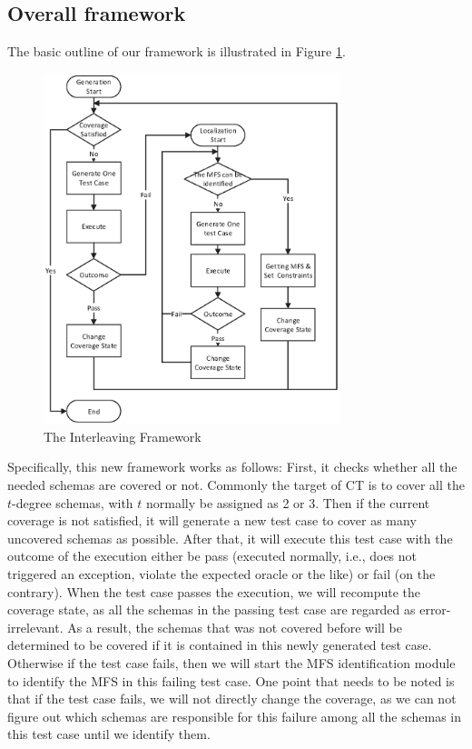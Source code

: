 \documentclass{sig-alternate}
\begin{document}
\subsection{Overall framework}
 The basic outline of our framework is illustrated in Figure \ref{new-life}.
\begin{figure}
 \includegraphics[width=3.4in]{baicOutline.eps}
\caption{The Interleaving Framework}
\label{new-life}
\end{figure}
Specifically, this new framework works as follows: First, it checks whether all the needed schemas are covered or not. Commonly the target of CT is to cover all the $t$-degree schemas, with $t$ normally be assigned as 2 or 3. Then if the current coverage is not satisfied, it will generate a new test case to cover as many uncovered schemas as possible. After that, it will execute this test case with the outcome of the execution either be pass (executed normally, i.e., does not triggered an exception, violate the expected oracle or the like) or fail (on the contrary). When the test case passes the execution, we will recompute the coverage state, as all the schemas in the passing test case are regarded as error-irrelevant. As a result, the schemas that was not covered before will be determined to be covered if it is contained in this newly generated test case. Otherwise if the test case fails, then we will start the MFS identification module to identify the MFS in this failing test case. One point that needs to be noted is that if the test case fails, we will not directly change the coverage, as we can not figure out which schemas are responsible for this failure among all the schemas in this test case until we identify them.
\end{document}

